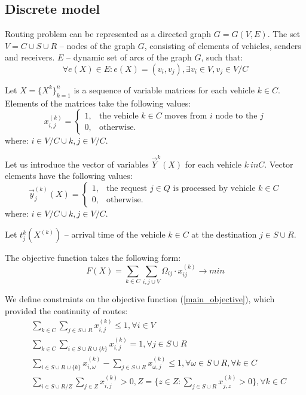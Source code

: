 \documentclass[]{TAACpaper}
\begin{document}
\subsection{Discrete model}
Routing problem can be represented as a directed graph $G=G(V,E)$. The set $V=C\cup{S}\cup{R}$ -- nodes of the graph $G$, consisting of elements of vehicles, senders and receivers. $E$ -- dynamic set of arcs of the graph $G$, such that:
\begin{equation}
\forall e(X) \in E: e(X) = (v_i,v_j), \exists v_i \in V, v_j \in V/C
\end{equation}

Let $X = \{X^k\}^n_{k=1}$ is a sequence of variable matrices for each vehicle $k \in C$. Elements of the matrices take the following values:
\begin{equation}
  x^{(k)}_{i,j} = 
    \begin{cases}
	  1,&\text{the vehicle $k \in C$ moves from $i$ node to the $j$}\\
	  0,&\text{otherwise.}
    \end{cases}
\end{equation}
where: $i\in{V/C \cup {k}}, j \in V/C$.

Let us introduce the vector  of variables $ \vec{Y}  ^ k(X) $ for each vehicle $ k \ in C $. Vector elements have the following values:
\begin{equation}
\vec{y}^{(k)}_{j}(X) = 
\begin{cases}
1,&\text{the request $j \in Q$ is processed by vehicle $k \in C$}\\
0,&\text{otherwise.}
\end{cases}
\end{equation}
where: $i\in{V/C \cup {k}}, j \in V/C$.


Let $t^k_j(X^{(k)})$ -- arrival time of the vehicle $k \in C$ at the destination $j \in S \cup R$. 

The objective function takes the following form:
\begin{equation} \label{main_objective}
  F(X) = 
    \sum_{k \in C}
     \sum_{i,j\cup{V}} 
     \Omega_{ij} \cdot x_{ij}^{(k)} 
     \to min
\end{equation}

We define constraints on the objective function (\ref{main_objective}), which provided the continuity of routes:
\begin{align} 
& \sum_{k \in C}\sum_{j \in S \cup R}x^{(k)}_{i,j} \leq 1, 
\forall i \in V \label{main_cond_1}\\
& \sum_{k \in C}\sum_{i \in S \cup R \cup \{k\} } x^{(k)}_{i,j} = 1, 
\forall j \in S \cup R \label{main_cond_2}\\
& \sum_{i \in S \cup R \cup \{k\} } x^{(k)}_{i,\omega} - 
\sum_{j \in S \cup R} x^{(k)}_{\omega,j} \leq 1, 
\forall \omega \in S \cup R,  \forall k \in C \label{main_cond_3}\\
&  \sum_{i \in S \cup R / Z}\sum_{j \in Z } x^{(k)}_{i,j} > 0, 
Z=\{z \in Z: \sum_{j \in S \cup R}x^{(k)}_{j,z}>0 \}  ,\forall k \in C \label{main_cond_4}
\end{align}
\end{document}
